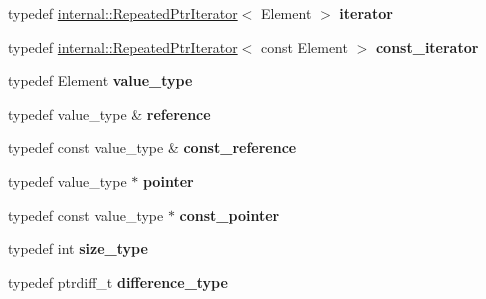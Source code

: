 \begin{DoxyCompactItemize}
typedef \hyperlink{classgoogle_1_1protobuf_1_1internal_1_1RepeatedPtrIterator}{internal\+::\+Repeated\+Ptr\+Iterator}$<$ Element $>$ {\bfseries iterator}
\item 
\mbox{\label{classgoogle_1_1protobuf_1_1RepeatedPtrField_a5d911f8dec436d098c02a10c5502972b}} 
typedef \hyperlink{classgoogle_1_1protobuf_1_1internal_1_1RepeatedPtrIterator}{internal\+::\+Repeated\+Ptr\+Iterator}$<$ const Element $>$ {\bfseries const\+\_\+iterator}
\item 
\mbox{\label{classgoogle_1_1protobuf_1_1RepeatedPtrField_a3c7391f763fae60c7ddc200333dc6d27}} 
typedef Element {\bfseries value\+\_\+type}
\item 
\mbox{\label{classgoogle_1_1protobuf_1_1RepeatedPtrField_a17c41b4874464e1d4dd2cbf2bd970737}} 
typedef value\+\_\+type \& {\bfseries reference}
\item 
\mbox{\label{classgoogle_1_1protobuf_1_1RepeatedPtrField_aa99421b3924e8a2860c71d96b9a70d8c}} 
typedef const value\+\_\+type \& {\bfseries const\+\_\+reference}
\item 
\mbox{\label{classgoogle_1_1protobuf_1_1RepeatedPtrField_abcde50d892adaf6dc5654eb847cfb27d}} 
typedef value\+\_\+type $\ast$ {\bfseries pointer}
\item 
\mbox{\label{classgoogle_1_1protobuf_1_1RepeatedPtrField_ae896bc1a20cb37cdd11e76272e7a696a}} 
typedef const value\+\_\+type $\ast$ {\bfseries const\+\_\+pointer}
\item 
\mbox{\label{classgoogle_1_1protobuf_1_1RepeatedPtrField_a7890884cc752b986c9674263f1fb89f2}} 
typedef int {\bfseries size\+\_\+type}
\item 
\mbox{\label{classgoogle_1_1protobuf_1_1RepeatedPtrField_a94f7bc34ad1579983fd2144260142a1d}} 
typedef ptrdiff\+\_\+t {\bfseries difference\+\_\+type}
\item 

\end{DoxyCompactItemize}
